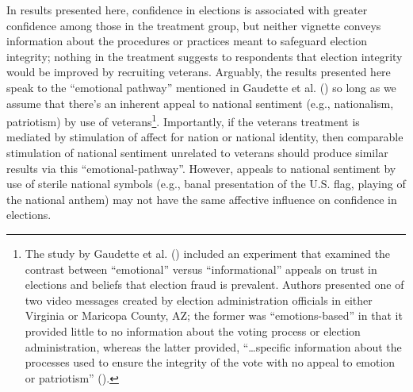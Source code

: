 \documentclass[
  12pt,
  letterpaper,
]{article}
\begin{document}
In results presented here, confidence in elections is associated with
greater confidence among those in the treatment group, but neither
vignette conveys information about the procedures or practices meant to
safeguard election integrity; nothing in the treatment suggests to
respondents that election integrity would be improved by recruiting
veterans. Arguably, the results presented here speak to the ``emotional
pathway'' mentioned in Gaudette et al.
() so long as we assume that there's an
inherent appeal to national sentiment (e.g., nationalism, patriotism) by
use of veterans\footnote{The study by Gaudette et al.
  () included an experiment that
  examined the contrast between ``emotional'' versus ``informational''
  appeals on trust in elections and beliefs that election fraud is
  prevalent. Authors presented one of two video messages created by
  election administration officials in either Virginia or Maricopa
  County, AZ; the former was ``emotions-based'' in that it provided
  little to no information about the voting process or election
  administration, whereas the latter provided, ``\ldots specific
  information about the processes used to ensure the integrity of the
  vote with no appeal to emotion or patriotism''
  ().}. Importantly, if the
veterans treatment is mediated by stimulation of affect for nation or
national identity, then comparable stimulation of national sentiment
unrelated to veterans should produce similar results via this
``emotional-pathway''. However, appeals to national sentiment by use of
sterile national symbols (e.g., banal presentation of the U.S. flag,
playing of the national anthem) may not have the same affective
influence on confidence in elections.
\end{document}
